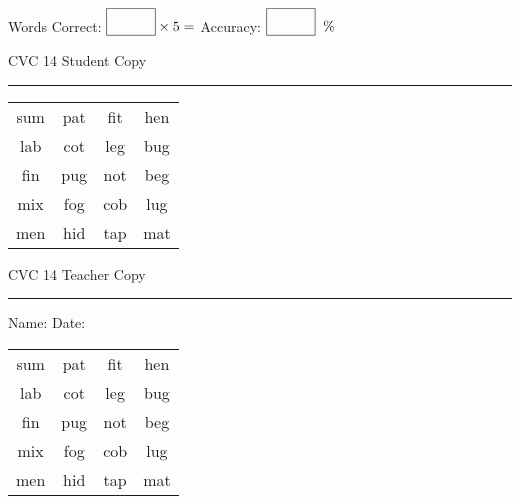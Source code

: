 \documentclass{memoir}
\begin{document}
\small

Words Correct: $\fbox{\phantom{\huge 100}} \times 5 = $ Accuracy: $\fbox{\phantom{\huge 100}}\;\; \%$ 

\vfill

\newpage


\footnotesize \noindent
CVC 14 \hfill Student Copy
\smallskip
\hrule

\Large

\setlength{\tabcolsep}{14pt}
\def\arraystretch{2}

{\selectfont


\begin{vplace}[0.5]
\begin{center}
\begin{tabular}{cccc}
sum & pat & fit & hen \\
lab & cot & leg & bug \\
fin & pug & not & beg \\
mix & fog & cob & lug \\
men & hid & tap & mat \\
\end{tabular}
\end{center}
\end{vplace}

}

\newpage

\footnotesize \noindent
CVC 14 \hfill Teacher Copy
\smallskip
\hrule

\small

\vfill

\noindent
Name: \underline{\hspace{1.75in}} \hfill Date: \underline{\hspace{1in}}

\Large

{\selectfont


\begin{vplace}[0.5]
\begin{center}
\begin{tabular}{cccc}
sum & pat & fit & hen \\
lab & cot & leg & bug \\
fin & pug & not & beg \\
mix & fog & cob & lug \\
men & hid & tap & mat \\
\end{tabular}
\end{center}
\end{vplace}



}
\end{document}
